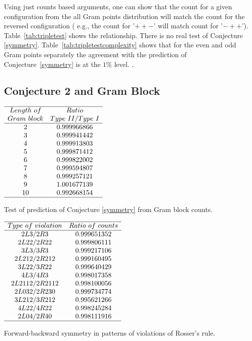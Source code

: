 \documentclass[twoside]{article}
\begin{document}
Using just counts based arguments, one can show that the count for a given configuration from the all Gram points distribution  will match the count for the reversed configuration ( e.g., the count for '$++-$' will match count for '$-++$'). Table~\ref{tab:tripletest} shows the relationship. There is no real test of Conjecture \ref{symmetry}.
Table~\ref{tab:tripletestcomplexity} shows that for the even and odd Gram points separately the agreement with the prediction of Conjecture~\ref{symmetry} is at the $1\%$ level. .

\subsection{\label{sec4c}Conjecture 2 and Gram Block}

\begin{table}
\centering \(\begin{array}{cc}
\hline
Length~of 	& Ratio  \\
Gram~block	& Type~II/Type~I \\
\hline
2& 0.999966866\\
3& 0.999941442\\
4& 0.999913803\\
5& 0.999871412\\
6& 0.999822002\\
7& 0.999594807\\
8& 0.999257121\\
9& 1.001677139\\
10& 0.992668154\\
\hline
\end{array}\)
\caption{Test of prediction of Conjecture \ref{symmetry} from Gram block counts.} \label{tab:rosser}
\end{table}

\begin{table}
\centering \(\begin{array}{cc}
\hline
Type~of~violation &Ratio~of~counts\\
\hline
2L3/2R3 &0.999651352\\
2L22/2R22 &0.999806111\\
3L3/3R3 &0.999217106\\
2L212/2R212 &0.999160495\\
3L22/3R22 &0.999640429\\
4L3/4R3 &0.998017358\\
2L2112/2R2112 &0.998100056\\
2L032/2R230 &0.999734774\\
3L212/3R212 &0.995621266\\
4L22/4R22 &0.998245284\\
2L04/2R40 &0.998111916\\
\hline
\end{array}\)
\caption{Forward-backward symmetry in patterns of violations of Rosser's rule.} \label{tab:vrr}
\end{table}
\end{document}
